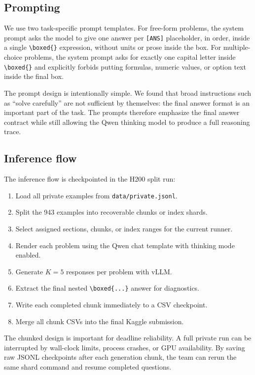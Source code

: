 \documentclass{article}
\begin{document}
\subsection{Prompting}

We use two task-specific prompt templates. For free-form problems, the system prompt asks the model to give one answer per \texttt{[ANS]} placeholder, in order, inside a single \verb|\boxed{}| expression, without units or prose inside the box. For multiple-choice problems, the system prompt asks for exactly one capital letter inside \verb|\boxed{}| and explicitly forbids putting formulas, numeric values, or option text inside the final box.

The prompt design is intentionally simple. We found that broad instructions such as ``solve carefully'' are not sufficient by themselves: the final answer format is an important part of the task. The prompts therefore emphasize the final answer contract while still allowing the Qwen thinking model to produce a full reasoning trace.

\subsection{Inference flow}

The inference flow is checkpointed in the H200 split run:

\begin{enumerate}
  \item Load all private examples from \texttt{data/private.jsonl}.
  \item Split the 943 examples into recoverable chunks or index shards.
  \item Select assigned sections, chunks, or index ranges for the current runner.
  \item Render each problem using the Qwen chat template with thinking mode enabled.
  \item Generate $K=5$ responses per problem with vLLM.
  \item Extract the final nested \verb|\boxed{...}| answer for diagnostics.
  \item Write each completed chunk immediately to a CSV checkpoint.
  \item Merge all chunk CSVs into the final Kaggle submission.
\end{enumerate}

The chunked design is important for deadline reliability. A full private run can be interrupted by wall-clock limits, process crashes, or GPU availability. By saving raw JSONL checkpoints after each generation chunk, the team can rerun the same shard command and resume completed questions.
\end{document}
